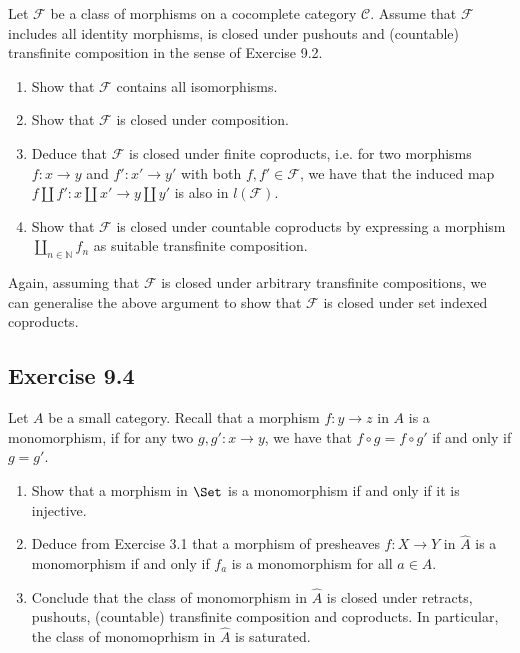 Let $ \mathcal{ F } $ be a class of morphisms on a cocomplete category $ \mathcal{ C } $.
Assume that $ \mathcal{ F } $ includes all identity morphisms, is closed under pushouts and (countable) transfinite composition in the sense of Exercise 9.2.

\begin{enumerate}[label=(\alph*)]
    \item 
    Show that $ \mathcal{ F } $ contains all isomorphisms.

    \item 
    Show that $ \mathcal{ F } $ is closed under composition.

    \item 
    Deduce that $ \mathcal{ F } $ is closed under finite coproducts, i.e. for two morphisms $ f : x  \to y $ and $ f' : x' \to y' $ with both $ f , f' \in \mathcal{ F } $, we have that the induced map $ f \amalg f' : x \amalg x' \to y \amalg y' $ is also in $ l ( \mathcal{ F } ) $.

    \item 
    Show that $ \mathcal{ F } $ is closed under countable coproducts by expressing a morphism $ \coprod_{ n \in \mathbb{ N } } f_n $ as suitable transfinite composition.
    
\end{enumerate}

Again, assuming that $ \mathcal{ F } $ is closed under arbitrary transfinite compositions, we can generalise the above argument to show that $ \mathcal{ F } $ is closed under set indexed coproducts.

\subsection{ Exercise 9.4 }

Let $ A $ be a small category. 
Recall that a morphism $ f : y \to z $ in $ A $ is a monomorphism, if for any two $ g , g' : x \to y $, we have that $ f \circ g = f \circ g' $ if and only if $ g = g' $.

\begin{enumerate}[label=(\alph*)]
    \item 
    Show that a morphism in $ \Set $ is a monomorphism if and only if it is injective.

    \item 
    Deduce from Exercise 3.1 that a morphism of presheaves $ f : X \to Y $ in $ \widehat{ A } $ is a monomorphism if and only if $ f_a $ is a monomorphism for all $ a \in A $.

    \item 
    Conclude that the class of monomorphism in $ \widehat{ A } $ is closed under retracts, pushouts, (countable) transfinite composition and coproducts. In particular, the class of monomoprhism in $ \widehat{ A } $ is saturated.
\end{enumerate}

